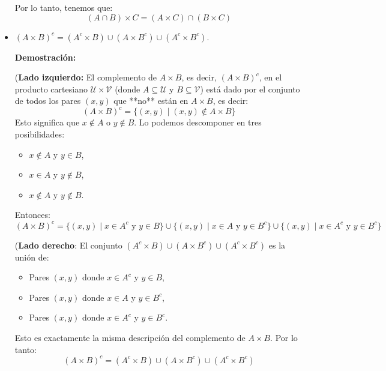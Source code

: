 \begin{solution}
\begin{itemize}
        Por lo tanto, tenemos que:
        \[
        (A \cap B) \times C = (A \times C) \cap (B \times C)
        \]
        \item $(A \times B)^c = (A^c \times B) \cup (A \times B^c) \cup (A^c \times B^c)$.

        \textbf{Demostración:}

        (\textbf{Lado izquierdo:} El complemento de \( A \times B \), es decir, \( (A \times B)^c \), en el producto cartesiano \( \mathscr{U} \times \mathscr{V} \) (donde \( A \subseteq \mathscr{U} \) y \( B \subseteq \mathscr{V} \)) está dado por el conjunto de todos los pares \( (x, y) \) que **no** están en \( A \times B \), es decir:
          \[
          (A \times B)^c = \{(x, y) \mid (x, y) \notin A \times B\}
          \]
          Esto significa que \( x \notin A \) o \( y \notin B \). Lo podemos descomponer en tres posibilidades:
          \begin{itemize}
            \item \( x \notin A \) y \( y \in B \),
            \item \( x \in A \) y \( y \notin B \),
            \item \( x \notin A \) y \( y \notin B \).
          \end{itemize}
        
          Entonces:
          \[
          (A \times B)^c = \{(x, y) \mid x \in A^c \text{ y } y \in B\} \cup \{(x, y) \mid x \in A \text{ y } y \in B^c\} \cup \{(x, y) \mid x \in A^c \text{ y } y \in B^c\}
          \]
        
        (\textbf{Lado derecho}: El conjunto \( (A^c \times B) \cup (A \times B^c) \cup (A^c \times B^c) \) es la unión de:
        \begin{itemize}
            \item Pares \( (x, y) \) donde \( x \in A^c \) y \( y \in B \),
            \item Pares \( (x, y) \) donde \( x \in A \) y \( y \in B^c \),
            \item Pares \( (x, y) \) donde \( x \in A^c \) y \( y \in B^c \).
        \end{itemize}
        
        Esto es exactamente la misma descripción del complemento de \( A \times B \). Por lo tanto:
        \[
        (A \times B)^c = (A^c \times B) \cup (A \times B^c) \cup (A^c \times B^c)
        \]
    \end{itemize}
\end{solution}